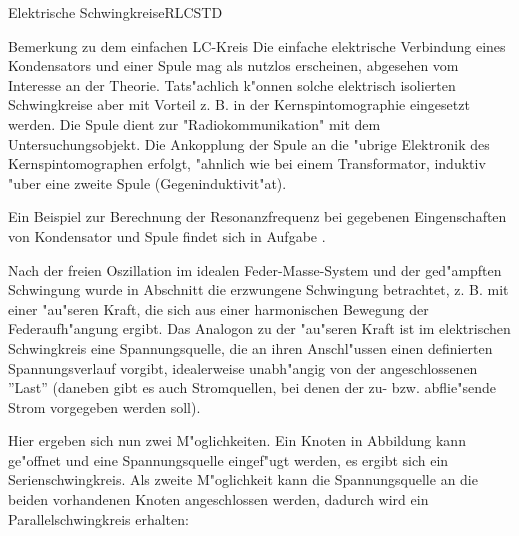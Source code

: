 \begin{MXContent}{Elektrische Schwingkreise}{RLC}{STD}
  \begin{MHint}{Bemerkung zu dem einfachen LC-Kreis}
  Die einfache elektrische Verbindung eines Kondensators und einer Spule mag als nutzlos erscheinen, abgesehen vom Interesse an der Theorie. Tats"achlich k"onnen solche elektrisch isolierten Schwingkreise aber mit Vorteil z. B. in der Kernspintomographie eingesetzt werden. Die Spule dient zur "Radiokommunikation" mit dem Untersuchungsobjekt. Die Ankopplung der Spule an die "ubrige Elektronik des Kernspintomographen erfolgt, "ahnlich wie bei einem Transformator, induktiv "uber eine zweite Spule (Gegeninduktivit"at).
  \end{MHint}

Ein Beispiel zur Berechnung der Resonanzfrequenz bei gegebenen Eingenschaften von Kondensator und Spule findet sich in Aufgabe .

Nach der freien Oszillation im idealen Feder-Masse-System und der ged"ampften Schwingung wurde in Abschnitt  die erzwungene Schwingung betrachtet, z. B. mit einer "au"seren Kraft, die sich aus einer harmonischen Bewegung der Federaufh"angung ergibt.
Das Analogon zu der "au"seren Kraft ist im elektrischen Schwingkreis eine Spannungsquelle, die an ihren Anschl"ussen einen definierten Spannungsverlauf vorgibt, idealerweise unabh"angig von der angeschlossenen ''Last'' (daneben gibt es auch Stromquellen, bei denen der zu- bzw. abflie"sende Strom vorgegeben werden soll). 

Hier ergeben sich nun zwei M"oglichkeiten. Ein Knoten in Abbildung  kann ge"offnet und eine Spannungsquelle eingef"ugt werden, es ergibt sich ein Serienschwingkreis. Als zweite M"oglichkeit kann die Spannungsquelle an die beiden vorhandenen Knoten angeschlossen werden, dadurch wird ein Parallelschwingkreis erhalten:
\begin{center}
\end{center}


\end{MXContent}
